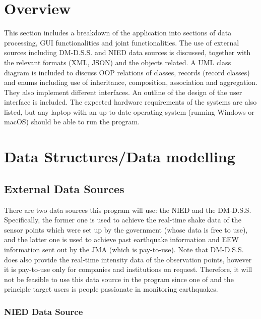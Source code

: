 \section*{Overview}
This section includes a breakdown of the application into sections of data processing, GUI functionalities and joint functionalities. The use of external sources including DM-D.S.S. and NIED data sources is discussed, together with the relevant formats (XML, JSON) and the objects related. A UML class diagram is included to discuss OOP relations of classes, records (record classes) and enums including use of inheritance, composition, association and aggregation. They also implement different interfaces. An outline of the design of the user interface is included. The expected hardware requirements of the systems are also listed, but any laptop with an up-to-date operating system (running Windows or macOS) should be able to run the program.

\section{Data Structures/Data modelling}

\subsection{External Data Sources}
There are two data sources this program will use: the NIED and the DM-D.S.S. Specifically, the former one is used to achieve the real-time shake data of the sensor points which were set up by the government (whose data is free to use), and the latter one is used to achieve past earthquake information and EEW information sent out by the JMA (which is pay-to-use). Note that DM-D.S.S. does also provide the real-time intensity data of the observation points, however it is pay-to-use only for companies and institutions on request. Therefore, it will not be feasible to use this data source in the program since one of and the principle target users is people passionate in monitoring earthquakes.

\subsubsection{NIED Data Source}

